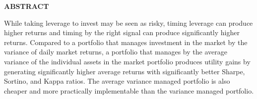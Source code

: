 \centerline{\bf ABSTRACT}

\begin{doublespace}  %
%
%
%
%
%
%
%
%
  \noindent While taking leverage to invest may be seen as risky, timing leverage can produce higher returns and timing by the right signal can produce significantly higher returns. Compared to a portfolio that manages investment in the market by the variance of daily market returns, a portfolio that manages by the average variance of the individual assets in the market portfolio produces utility gains by generating significantly higher average returns with significantly better Sharpe, Sortino, and Kappa ratios. The average variance managed portfolio is also cheaper and more practically implementable than the variance managed portfolio.
\end{doublespace}
